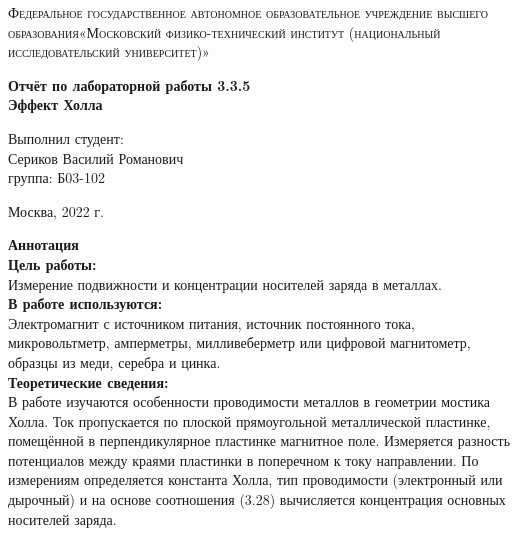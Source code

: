 \documentclass[a4paper, 12pt]{article}%
\begin{document}
	\begin{titlepage}
		\begin{center}
			\textsc{Федеральное государственное автономное образовательное учреждение высшего образования«Московский физико-технический институт (национальный исследовательский университет)»\\[5mm]
			}
			
			\vfill
			
			\textbf{Отчёт по лабораторной работы 3.3.5\\[3mm]
				Эффект Холла
				\\[50mm]
			}
			
		\end{center}
		
		\hfill
		\begin{minipage}{.5\textwidth}
			Выполнил студент:\\[2mm]
			Сериков Василий Романович\\[2mm]
			группа: Б03-102\\[5mm]
			
		\end{minipage}
		\vfill
		\begin{center}
			Москва, 2022 г.
		\end{center}
		
	\end{titlepage}
	
	\newpage
	\textbf{Аннотация}\\
	
	
	\textbf{Цель работы: }\\
	Измерение подвижности и концентрации носителей заряда
	в металлах.\\
	
	\textbf{В работе используются: }\\
	Электромагнит с источником питания, источник постоянного тока, микровольтметр, амперметры, милливеберметр или
	цифровой магнитометр, образцы из меди, серебра и цинка.\\
	
	\textbf{Теоретические сведения: } \\
	В работе изучаются особенности проводимости металлов в геометрии
	мостика Холла. Ток пропускается по плоской прямоугольной металлической пластинке, помещённой в перпендикулярное пластинке магнитное
	поле. Измеряется разность потенциалов между краями пластинки в поперечном к току направлении. По измерениям определяется константа
	Холла, тип проводимости (электронный или дырочный) и на основе соотношения (3.28) вычисляется концентрация основных носителей заряда.
	
\end{document}
